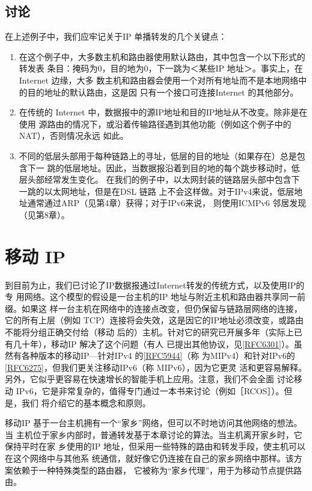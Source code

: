 \subsection{讨论}
在上述例子中，我们应牢记关于IP 单播转发的几个关键点：

\begin{enumerate}
  \item 在这个例子中，大多数主机和路由器使用默认路由，其中包含一个以下形式的转发表
    条目：掩码为0，目的地为0，下一跳为＜某些IP 地址＞。事实上，在 Internet 边缘，大多
    数主机和路由器会使用一个对所有地址而不是本地网络中的目的地址的默认路由，这是因
    只有一个接口可连接Internet 的其他部分。

  \item 在传统的 Internet 中，数据报中的源IP地址和目的IP地址从不改变。除非是在使用
    源路由的情况下，或沿着传输路径遇到其他功能（例如这个例子中的NAT），否则情况永远
    如此。

  \item 不同的低层头部用于每种链路上的寻址，低层的目的地址（如果存在）总是包含下一
    跳的低层地址。因此，当数据报沿着到目的地的每个跳步移动时，低层头部经常发生变化。
    在我们的例子中，以太网封装的链路层头部中包含下一跳的以太网地址，但是在DSL 链路
    上不会这样做。对于IPv4来说，低层地址通常通过ARP（见第4章）获得；对于IPv6来说，
    则使用ICMPv6 邻居发现（见第8章）。
\end{enumerate}

\section{移动 IP}
到目前为止，我们已讨论了IP数据报通过Internet转发的传统方式，以及使用IP的专
用网络。这个模型的假设是一台主机的IP 地址与附近主机和路由器共享同一前缀。如果这
样一台主机在网络中的连接点改变，但仍保留与链路层网络的连接，它的所有上层（例如
TCP）连接将会失效，这是因它的IP地址必须改变，或路由不能将分组正确交付给（移动
后的）主机。针对它的研究已开展多年（实际上已有几十年），移动IP 解决了这个问题（有人
已提出其他协议，见\href{https://www.rfc-editor.org/rfc/rfc6301}{[RFC6301]}）。虽然有各种版本的移动IP—针对IPv4
的\href{https://www.rfc-editor.org/rfc/rfc5944}{[RFC5944]}（称
为MIPv4）和针对IPv6的\href{https://www.rfc-editor.org/rfc/rfc6275}{[RFC6275]}，但我们更关注移动IPv6（称
MIPv6），因为它更灵
活和更容易解释。另外，它似乎更容易在快速增长的智能手机上应用。注意，我们不会全面
讨论移动 IPv6，它是非常复杂的，值得专门通过一本书来讨论（例如［RCOS］）。但是，我们
将介绍它的基本概念和原则。

移动IP 基于一台主机拥有一个“家乡”网络，但可以不时地访问其他网络的想法。当
主机位于家乡内部时，普通转发基于本章讨论的算法。当主机离开家乡时，它保持平时在家
乡使用的IP 地址，但采用一些特殊的路由和转发手段，使主机可以在这个网络中与其他系
统通信，就好像它仍连接在自己的家乡网络中那样。该方案依赖于一种特殊类型的路由器，
它被称为“家乡代理”，用于为移动节点提供路由。

